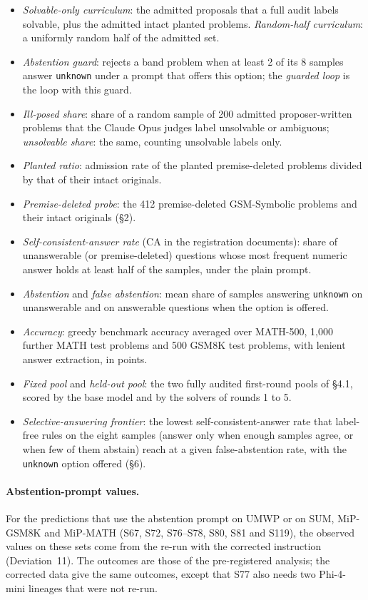 \documentclass[10pt,a4paper]{article}
\newcommand{\unk}{\texttt{unknown}}
\begin{document}
\begin{itemize}\setlength{\itemsep}{0pt}\setlength{\parskip}{0pt}
\item \emph{Solvable-only curriculum}: the admitted proposals that a full audit labels solvable, plus the admitted intact planted problems. \emph{Random-half curriculum}: a uniformly random half of the admitted set.
\item \emph{Abstention guard}: rejects a band problem when at least 2 of its 8 samples answer \unk{} under a prompt that offers this option; the \emph{guarded loop} is the loop with this guard.
\item \emph{Ill-posed share}: share of a random sample of 200 admitted proposer-written problems that the Claude Opus judges label unsolvable or ambiguous; \emph{unsolvable share}: the same, counting unsolvable labels only.
\item \emph{Planted ratio}: admission rate of the planted premise-deleted problems divided by that of their intact originals.
\item \emph{Premise-deleted probe}: the 412 premise-deleted GSM-Symbolic problems and their intact originals (\S2).
\item \emph{Self-consistent-answer rate} (CA in the registration documents): share of unanswerable (or premise-deleted) questions whose most frequent numeric answer holds at least half of the samples, under the plain prompt.
\item \emph{Abstention} and \emph{false abstention}: mean share of samples answering \unk{} on unanswerable and on answerable questions when the option is offered.
\item \emph{Accuracy}: greedy benchmark accuracy averaged over MATH-500, 1,000 further MATH test problems and 500 GSM8K test problems, with lenient answer extraction, in points.
\item \emph{Fixed pool} and \emph{held-out pool}: the two fully audited first-round pools of \S4.1, scored by the base model and by the solvers of rounds 1 to 5.
\item \emph{Selective-answering frontier}: the lowest self-consistent-answer rate that label-free rules on the eight samples (answer only when enough samples agree, or when few of them abstain) reach at a given false-abstention rate, with the \unk{} option offered (\S6).
\end{itemize}

\paragraph{Abstention-prompt values.} For the predictions that use the abstention prompt on UMWP or on SUM, MiP-GSM8K and MiP-MATH (S67, S72, S76--S78, S80, S81 and S119), the observed values on these sets come from the re-run with the corrected instruction (Deviation~11). The outcomes are those of the pre-registered analysis; the corrected data give the same outcomes, except that S77 also needs two Phi-4-mini lineages that were not re-run.
\end{document}
